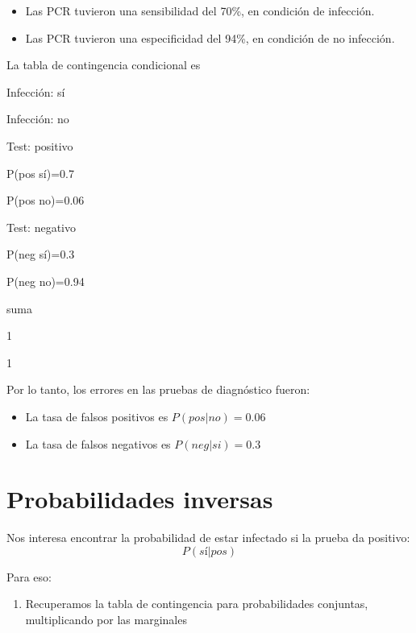 \documentclass[
]{book}
\providecommand{\tightlist}{%
  \setlength{\itemsep}{0pt}\setlength{\parskip}{0pt}}
\begin{document}
\begin{itemize}
\tightlist
\item
  Las PCR tuvieron una sensibilidad del 70\%, en condición de infección.
\item
  Las PCR tuvieron una especificidad del 94\%, en condición de no infección.
\end{itemize}

La tabla de contingencia condicional es

Infección: sí

Infección: no

Test: positivo

P(pos {\textbar{}} sí)=0.7

P(pos {\textbar{}} no)=0.06

Test: negativo

P(neg {\textbar{}} sí)=0.3

P(neg {\textbar{}} no)=0.94

suma

1

1

Por lo tanto, los errores en las pruebas de diagnóstico fueron:

\begin{itemize}
\tightlist
\item
  La tasa de falsos positivos es \(P(pos|no)=0.06\)
\item
  La tasa de falsos negativos es \(P(neg|si)=0.3\)
\end{itemize}

\hypertarget{probabilidades-inversas}{%
\section{Probabilidades inversas}\label{probabilidades-inversas}}

Nos interesa encontrar la probabilidad de estar infectado si la prueba da positivo: \[P(sí|pos)\]

Para eso:

\begin{enumerate}
\def\labelenumi{\arabic{enumi}.}
\tightlist
\item
  Recuperamos la tabla de contingencia para probabilidades conjuntas, multiplicando por las marginales
\end{enumerate}
\end{document}
